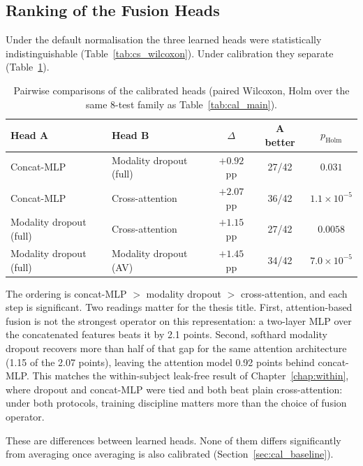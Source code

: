 \subsection{Ranking of the Fusion Heads}
\label{sec:cal_ranking}

Under the default normalisation the three learned heads were statistically
indistinguishable (Table~\ref{tab:cs_wilcoxon}). Under calibration they separate
(Table~\ref{tab:cal_ranking}).

\begin{table}[htbp]
\centering
\small
\caption{Pairwise comparisons of the calibrated heads (paired Wilcoxon, Holm over
the same 8-test family as Table~\ref{tab:cal_main}).}
\label{tab:cal_ranking}
\begin{tabular}{llccc}
\hline
\textbf{Head A} & \textbf{Head B} & \textbf{$\Delta$} & \textbf{A better} & \textbf{$p_{\mathrm{Holm}}$} \\
\hline
Concat-MLP              & Modality dropout (full) & $+0.92$ pp & 27/42 & $0.031$ \\
Concat-MLP              & Cross-attention         & $+2.07$ pp & 36/42 & $1.1\times10^{-5}$ \\
Modality dropout (full) & Cross-attention         & $+1.15$ pp & 27/42 & $0.0058$ \\
Modality dropout (full) & Modality dropout (AV)   & $+1.45$ pp & 34/42 & $7.0\times10^{-5}$ \\
\hline
\end{tabular}
\end{table}

The ordering is concat-MLP $>$ modality dropout $>$ cross-attention, and each step is
significant. Two readings matter for the thesis title. First, attention-based fusion
is not the strongest operator on this representation: a two-layer MLP over the
concatenated features beats it by 2.1 points. Second, softhard modality dropout
recovers more than half of that gap for the same attention architecture (1.15 of the
2.07 points), leaving the attention model 0.92 points behind concat-MLP. This matches
the within-subject leak-free result of Chapter~\ref{chap:within}, where dropout and
concat-MLP were tied and both beat plain cross-attention: under both protocols,
training discipline matters more than the choice of fusion operator.

These are differences between learned heads. None of them differs significantly from
averaging once averaging is also calibrated (Section~\ref{sec:cal_baseline}).

